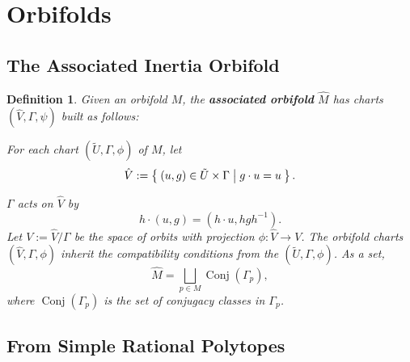 \documentclass{article}
\newtheorem{defn}[theorem]{Definition\rm}
\newcommand{\ra}{\rightarrow}
\DeclareMathOperator{\Conj}{Conj}
\begin{document}
	\section{Orbifolds}
	\subsection{The Associated Inertia Orbifold}
	
	\begin{defn}
		Given an orbifold $M$, the \textbf{associated orbifold} $\hat{M}$ has charts $(\hat{V}, \Gamma, \psi)$ built as follows:
		
		For each chart $(\tilde{U}, \Gamma, \phi)$ of $M$, let
		\begin{equation*}
			\hat{V} := \Set{(u,g) \in \tilde{U} \times \Gamma | g \cdot u = u }.
		\end{equation*}
	
	$\Gamma$ acts on $\hat{V}$ by
	\begin{equation*}
		h \cdot (u,g) = (h \cdot u, hgh^{-1}).
	\end{equation*}
	Let $V := \hat{V}/\Gamma$ be the space of orbits with projection $\phi : \hat{V} \ra V$. The orbifold charts $(\hat{V}, \Gamma, \phi)$ inherit the compatibility conditions from the $(\tilde{U}, \Gamma, \phi)$. As a set,
	\begin{equation*}
		\hat{M} = \bigsqcup_{p \in M} \Conj(\Gamma_{p}),
	\end{equation*}
	where $\Conj(\Gamma_{p})$ is the set of conjugacy classes in $\Gamma_{p}$.
	\end{defn}


	
	
	
	
	
	
	
	
	
	
	
	
	
	
	
	
	
	
	
	
	\subsection{From Simple Rational Polytopes}
\end{document}
